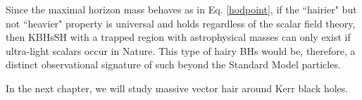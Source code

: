 \bigskip

Since the maximal horizon mass behaves as in Eq. \eqref{hodpoint}, if the ``hairier" but not ``heavier" property is universal and holds regardless of the scalar field theory, then KBHsSH with a trapped region with astrophysical masses can only exist if ultra-light scalars occur in Nature. This type of hairy BHs would be, therefore, a distinct observational signature of such beyond the Standard Model particles.

\bigskip

In the next chapter, we will study massive vector hair around Kerr black holes.
%
%
%
%  
